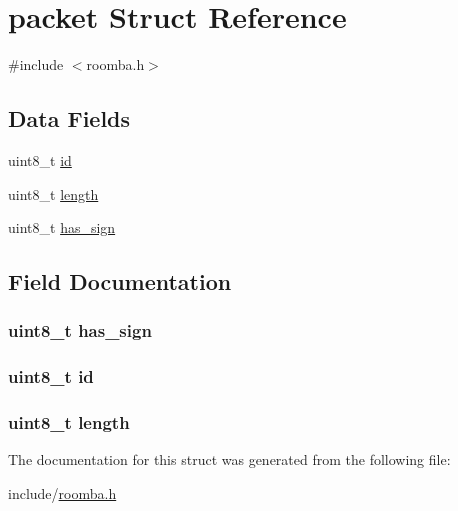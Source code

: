 \hypertarget{structpacket}{\section{packet \-Struct \-Reference}
\label{structpacket}
}


{\ttfamily \#include $<$roomba.\-h$>$}

\subsection*{\-Data \-Fields}
\begin{DoxyCompactItemize}
\item 
uint8\-\_\-t \hyperlink{structpacket_a1e6927fa1486224044e568f9c370519b}{id}
\item 
uint8\-\_\-t \hyperlink{structpacket_ab2b3adeb2a67e656ff030b56727fd0ac}{length}
\item 
uint8\-\_\-t \hyperlink{structpacket_a0511f5c7ac752193798ceb3787081337}{has\-\_\-sign}
\end{DoxyCompactItemize}


\subsection{\-Field \-Documentation}
\hypertarget{structpacket_a0511f5c7ac752193798ceb3787081337}{
\subsubsection[{has\-\_\-sign}]{\setlength{\rightskip}{0pt plus 5cm}uint8\-\_\-t {\bf has\-\_\-sign}}}\label{structpacket_a0511f5c7ac752193798ceb3787081337}
\hypertarget{structpacket_a1e6927fa1486224044e568f9c370519b}{
\subsubsection[{id}]{\setlength{\rightskip}{0pt plus 5cm}uint8\-\_\-t {\bf id}}}\label{structpacket_a1e6927fa1486224044e568f9c370519b}
\hypertarget{structpacket_ab2b3adeb2a67e656ff030b56727fd0ac}{
\subsubsection[{length}]{\setlength{\rightskip}{0pt plus 5cm}uint8\-\_\-t {\bf length}}}\label{structpacket_ab2b3adeb2a67e656ff030b56727fd0ac}


\-The documentation for this struct was generated from the following file\-:\begin{DoxyCompactItemize}
\item 
include/\hyperlink{roomba_8h}{roomba.\-h}\end{DoxyCompactItemize}
